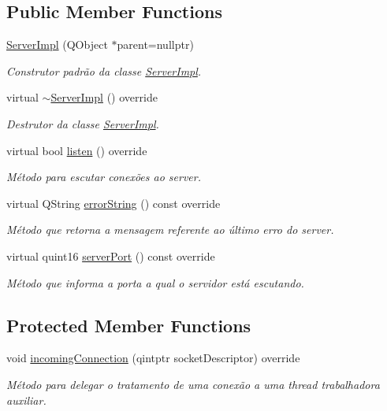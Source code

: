 \subsection*{Public Member Functions}
\begin{DoxyCompactItemize}
\item 
\hyperlink{classServerImpl_a0c81e2a5af6cea9a1ff0445008c22e84}{Server\+Impl} (Q\+Object $\ast$parent=nullptr)
\begin{DoxyCompactList}\small\item\em Construtor padrão da classe \hyperlink{classServerImpl}{Server\+Impl}. \end{DoxyCompactList}\item 
virtual \hyperlink{classServerImpl_aef0bf73c21130de67a3f262dff915cd2}{$\sim$\+Server\+Impl} () override
\begin{DoxyCompactList}\small\item\em Destrutor da classe \hyperlink{classServerImpl}{Server\+Impl}. \end{DoxyCompactList}\item 
virtual bool \hyperlink{classServerImpl_a3a186b4e86c634750f8fb95f962d5ec9}{listen} () override
\begin{DoxyCompactList}\small\item\em Método para escutar conexões ao server. \end{DoxyCompactList}\item 
virtual Q\+String \hyperlink{classServerImpl_aaadf6ebb053052ee61303848374e8d20}{error\+String} () const override
\begin{DoxyCompactList}\small\item\em Método que retorna a mensagem referente ao último erro do server. \end{DoxyCompactList}\item 
virtual quint16 \hyperlink{classServerImpl_a769680151e32d74aeae35dfbb1dcbde0}{server\+Port} () const override
\begin{DoxyCompactList}\small\item\em Método que informa a porta a qual o servidor está escutando. \end{DoxyCompactList}\end{DoxyCompactItemize}
\subsection*{Protected Member Functions}
\begin{DoxyCompactItemize}
\item 
void \hyperlink{classServerImpl_a54dda38486e9964432b501f7da00ed97}{incoming\+Connection} (qintptr socket\+Descriptor) override
\begin{DoxyCompactList}\small\item\em Método para delegar o tratamento de uma conexão a uma thread trabalhadora auxiliar. \end{DoxyCompactList}\end{DoxyCompactItemize}
